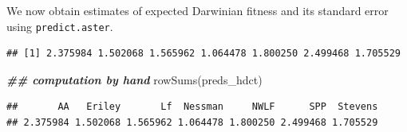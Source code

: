 \documentclass[
  ignorenonframetext,
]{beamer}
\newenvironment{Shaded}{\begin{snugshade}}{\end{snugshade}}
\newcommand{\AttributeTok}[1]{\textcolor[rgb]{0.77,0.63,0.00}{#1}}
\newcommand{\ConstantTok}[1]{\textcolor[rgb]{0.00,0.00,0.00}{#1}}
\newcommand{\DocumentationTok}[1]{\textcolor[rgb]{0.56,0.35,0.01}{\textbf{\textit{#1}}}}
\newcommand{\FunctionTok}[1]{\textcolor[rgb]{0.00,0.00,0.00}{#1}}
\newcommand{\NormalTok}[1]{#1}
\newcommand{\OtherTok}[1]{\textcolor[rgb]{0.56,0.35,0.01}{#1}}
\newcommand{\SpecialCharTok}[1]{\textcolor[rgb]{0.00,0.00,0.00}{#1}}
\begin{document}
\begin{frame}[fragile]{}
\protect\hypertarget{section-39}{}
We now obtain estimates of expected Darwinian fitness and its standard
error using \texttt{predict.aster}.

\vspace{12pt}
\tiny

\begin{Shaded}
\end{Shaded}

\begin{verbatim}
## [1] 2.375984 1.502068 1.565962 1.064478 1.800250 2.499468 1.705529
\end{verbatim}

\begin{Shaded}
\begin{Highlighting}[]
\DocumentationTok{\#\# computation by hand}
\FunctionTok{rowSums}\NormalTok{(preds\_hdct)}
\end{Highlighting}
\end{Shaded}

\begin{verbatim}
##       AA   Eriley       Lf  Nessman     NWLF      SPP  Stevens 
## 2.375984 1.502068 1.565962 1.064478 1.800250 2.499468 1.705529
\end{verbatim}
\end{frame}
\end{document}
